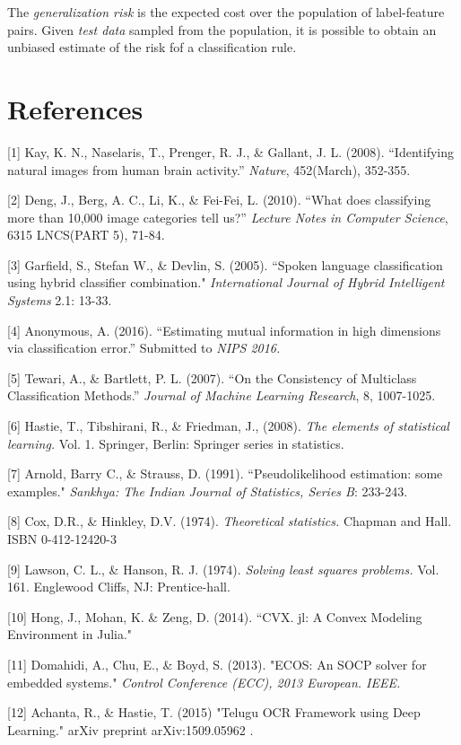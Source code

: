\documentclass[12pt]{article}
\begin{document}
The \emph{generalization risk} is the expected cost over the
population of label-feature pairs.  Given \emph{test data} sampled
from the population, it is possible to obtain an unbiased estimate of
the risk fof a classification rule.


\section*{References}

\small

[1] Kay, K. N., Naselaris, T., Prenger, R. J., \& Gallant, J. L. (2008). ``Identifying natural images from human brain activity.'' 
\emph{Nature}, 452(March), 352-355.

[2] Deng, J., Berg, A. C., Li, K., \& Fei-Fei, L. (2010). ``What does classifying more than 10,000 image categories tell us?'' \emph{Lecture Notes in Computer Science}, 6315 LNCS(PART 5), 71-84. 

[3] Garfield, S., Stefan W., \& Devlin, S. (2005). ``Spoken language classification using hybrid classifier combination." 
\emph{International Journal of Hybrid Intelligent Systems} 2.1: 13-33.

[4] Anonymous, A. (2016). ``Estimating mutual information in high dimensions via classification error.''  Submitted to 
\emph{NIPS 2016.}

[5] Tewari, A., \& Bartlett, P. L. (2007). ``On the Consistency of Multiclass Classification Methods.''
\emph{Journal of Machine Learning Research}, 8, 1007-1025.

[6] Hastie, T., Tibshirani, R., \& Friedman, J., (2008). \emph{The elements
of statistical learning.} Vol. 1. Springer, Berlin: Springer series in
statistics.

[7] Arnold, Barry C., \& Strauss, D.  (1991). ``Pseudolikelihood estimation: some examples." \emph{Sankhya: The Indian Journal of Statistics, Series B}: 233-243.

[8] Cox, D.R., \& Hinkley, D.V. (1974). \emph{Theoretical statistics.} Chapman and Hall. ISBN 0-412-12420-3

[9] Lawson, C. L., \& Hanson, R. J. (1974). \emph{Solving least squares problems.} Vol. 161. Englewood Cliffs, NJ: Prentice-hall.

[10] Hong, J., Mohan, K. \& Zeng, D. (2014). ``CVX. jl: A Convex Modeling Environment in Julia."

[11] Domahidi, A., Chu, E., \& Boyd, S. (2013). "ECOS: An SOCP solver for embedded systems." \emph{Control Conference (ECC), 2013 European. IEEE.}

[12] Achanta, R., \& Hastie, T. (2015) "Telugu OCR Framework using Deep Learning." arXiv preprint arXiv:1509.05962 .
\end{document}
